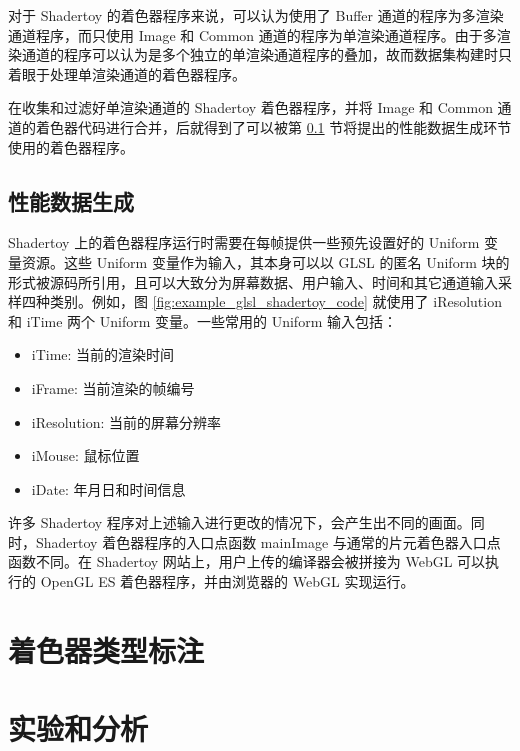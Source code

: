 对于 Shadertoy 的着色器程序来说，可以认为使用了 Buffer 通道的程序为多渲染通道程序，而只使用 Image 和 Common 通道的程序为单渲染通道程序。由于多渲染通道的程序可以认为是多个独立的单渲染通道程序的叠加，故而{\amend 数据集构建}时只着眼于处理单渲染通道的着色器程序。

{\added 在收集和过滤好单渲染通道的 Shadertoy 着色器程序，并将 Image 和 Common 通道的着色器代码进行合并，后就得到了可以被第 \ref{sec:perf_data_generation} 节将提出的性能数据生成环节使用的着色器程序。}

\subsection{性能数据生成}
\label{sec:perf_data_generation}


Shadertoy 上的着色器程序运行时需要在每帧提供一些预先设置好的 Uniform 变量资源。这些 Uniform 变量作为输入，其本身可以以 GLSL 的匿名 Uniform 块的形式被源码所引用，且可以大致分为屏幕数据、用户输入、时间和其它通道输入采样四种类别。例如，图 \ref{fig:example_glsl_shadertoy_code} 就使用了 iResolution 和 iTime 两个 Uniform 变量。一些常用的 Uniform 输入包括：
\begin{itemize}
    \item iTime: 当前的渲染时间
    \item iFrame: 当前渲染的帧编号
    \item iResolution: 当前的屏幕分辨率
    \item iMouse: 鼠标位置
    \item iDate: 年月日和时间信息
\end{itemize}

许多 Shadertoy 程序对上述输入进行更改的情况下，会产生出不同的画面。同时，Shadertoy 着色器程序的入口点函数 mainImage 与通常的片元着色器入口点函数不同。在 Shadertoy 网站上，用户上传的编译器会被拼接为 WebGL 可以执行的 OpenGL ES 着色器程序，并由浏览器的 WebGL 实现运行。

\section{着色器类型标注}


\section{实验和分析}


